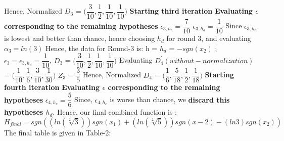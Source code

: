 \documentclass{article}
\begin{document}
 Hence, Normalized $D_{3}$ = $\bigg (  \dfrac{3}{10}, \dfrac{1}{2} , \dfrac{1}{10}, \dfrac{1}{10} \bigg )$ \newline
 \textbf {Starting third iteration} \newline
 \textbf {Evaluating $\epsilon$ corresponding to the remaining hypotheses} \newline
 $\epsilon_{3,h_{c}} = \dfrac{7}{10}$ \newline
 $\epsilon_{3,h_{d}} = \dfrac{1}{10}$ \newline
 Since $\epsilon_{3,h_{d}}$ is lowest and better than chance, hence choosing $h_{d}$ for round 3, and evaluating $\alpha_{3} = ln(3)$ \newline
 Hence, the data for Round-3 is: \newline
 h = $h_{d}$ = $-sgn(x_{2})$ ; $\epsilon_{3} = \epsilon_{3,h_{d}} = \dfrac{1}{10}$, $D_{3}$ = $\bigg (  \dfrac{3}{10}, \dfrac{1}{2} , \dfrac{1}{10}, \dfrac{1}{10} \bigg )$ \newline
 Evaluating $D_{4}^\prime(without-normalization)$ = $\bigg ( \dfrac{1}{10}, \dfrac{1}{6}, \dfrac{3}{10}, \dfrac{1}{30} \bigg )$ \newline
 $Z_{3}$ = $\dfrac{3}{5}$ \newline
 Hence, Normalized $D_{4}$ = $\bigg ( \dfrac{1}{6} , \dfrac{5}{18}, \dfrac{1}{2}, \dfrac{1}{18} \bigg )$ \newline
 \textbf {Starting fourth iteration} \newline
 \textbf {Evaluating $\epsilon$ corresponding to the remaining hypotheses} \newline
 $\epsilon_{4,h_{c}} = \dfrac{5}{6}$ \newline
 Since, $\epsilon_{4,h_{c}}$ is worse than chance, we \textbf {discard this hypotheses $h_{d}$}. \newline
 Hence, our final combined function is :\newline
 \begin{equation}
    H_{final} = sgn( (ln(\sqrt[2]{3}))sgn(x_{1}) + (ln(\sqrt[2]{5}))sgn(x-2) - (ln3)sgn(x_{2}))
 \end{equation}
 The final table is given in Table-2: \newline
\end{document}
